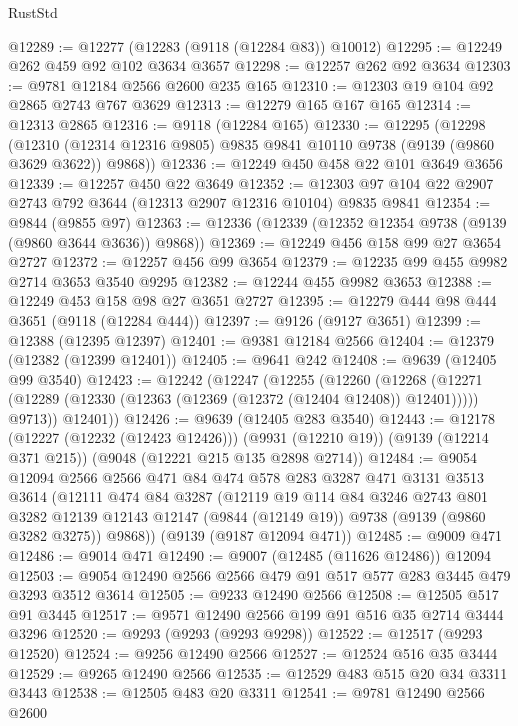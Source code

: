 \begin{lexlean}{RustStd}
\begin{coremodule}
@12289 := @12277 (@12283 (@9118 (@12284 @83)) @10012)
@12295 := @12249 @262 @459 @92 @102 @3634 @3657
@12298 := @12257 @262 @92 @3634
@12303 := @9781 @12184 @2566 @2600 @235 @165
@12310 := @12303 @19 @104 @92 @2865 @2743 @767 @3629
@12313 := @12279 @165 @167 @165
@12314 := @12313 @2865
@12316 := @9118 (@12284 @165)
@12330 := @12295
    (@12298
      (@12310 (@12314 @12316 @9805) @9835 @9841 @10110 @9738 (@9139 (@9860 @3629 @3622)) @9868))
@12336 := @12249 @450 @458 @22 @101 @3649 @3656
@12339 := @12257 @450 @22 @3649
@12352 := @12303 @97 @104 @22 @2907 @2743 @792 @3644 (@12313 @2907 @12316 @10104) @9835 @9841
@12354 := @9844 (@9855 @97)
@12363 := @12336 (@12339 (@12352 @12354 @9738 (@9139 (@9860 @3644 @3636)) @9868))
@12369 := @12249 @456 @158 @99 @27 @3654 @2727
@12372 := @12257 @456 @99 @3654
@12379 := @12235 @99 @455 @9982 @2714 @3653 @3540 @9295
@12382 := @12244 @455 @9982 @3653
@12388 := @12249 @453 @158 @98 @27 @3651 @2727
@12395 := @12279 @444 @98 @444 @3651 (@9118 (@12284 @444))
@12397 := @9126 (@9127 @3651)
@12399 := @12388 (@12395 @12397)
@12401 := @9381 @12184 @2566
@12404 := @12379 (@12382 (@12399 @12401))
@12405 := @9641 @242
@12408 := @9639 (@12405 @99 @3540)
@12423 := @12242
    (@12247
      (@12255
        (@12260
          (@12268
            (@12271 (@12289 (@12330 (@12363 (@12369 (@12372 (@12404 @12408)) @12401)))))
            @9713))
        @12401))
@12426 := @9639 (@12405 @283 @3540)
@12443 := @12178
    (@12227 (@12232 (@12423 @12426)))
    (@9931 (@12210 @19))
    (@9139 (@12214 @371 @215))
    (@9048 (@12221 @215 @135 @2898 @2714))
@12484 := @9054
    @12094
    @2566
    @2566
    @471
    @84
    @474
    @578
    @283
    @3287
    @471
    @3131
    @3513
    @3614
    (@12111
      @474
      @84
      @3287
      (@12119
        @19
        @114
        @84
        @3246
        @2743
        @801
        @3282
        @12139
        @12143
        @12147
        (@9844 (@12149 @19))
        @9738
        (@9139 (@9860 @3282 @3275))
        @9868))
    (@9139 (@9187 @12094 @471))
@12485 := @9009 @471
@12486 := @9014 @471
@12490 := @9007 (@12485 (@11626 @12486)) @12094
@12503 := @9054 @12490 @2566 @2566 @479 @91 @517 @577 @283 @3445 @479 @3293 @3512 @3614
@12505 := @9233 @12490 @2566
@12508 := @12505 @517 @91 @3445
@12517 := @9571 @12490 @2566 @199 @91 @516 @35 @2714 @3444 @3296
@12520 := @9293 (@9293 (@9293 @9298))
@12522 := @12517 (@9293 @12520)
@12524 := @9256 @12490 @2566
@12527 := @12524 @516 @35 @3444
@12529 := @9265 @12490 @2566
@12535 := @12529 @483 @515 @20 @34 @3311 @3443
@12538 := @12505 @483 @20 @3311
@12541 := @9781 @12490 @2566 @2600

\end{coremodule}
\end{lexlean}
